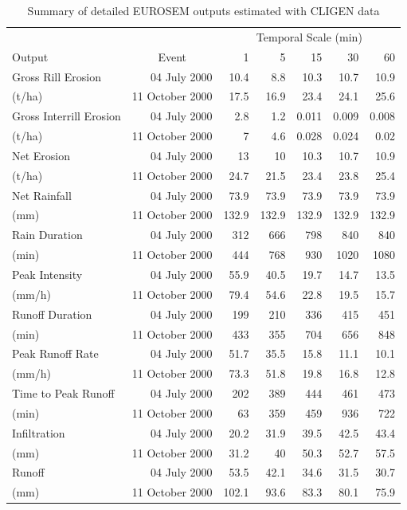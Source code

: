 \begin{table}[htbp]
\footnotesize
\caption{Summary of detailed EUROSEM outputs estimated with CLIGEN data}
\begin{center}
\begin{tabular}{lrrrrrr}
\toprule
\multicolumn{1}{l}{} & \multicolumn{1}{l}{} & \multicolumn{5}{c}{Temporal Scale
(min)} \\ \cmidrule{3-7}
\multicolumn{1}{l}{Output} & \multicolumn{1}{c}{Event} & 1 & 5 & 15 & 30 & 60 \\
\midrule
Gross Rill Erosion & 04 July 2000 & 10.4 & 8.8 & 10.3 & 10.7 & 10.9 \\
(t/ha) & 11 October 2000 & 17.5 & 16.9 & 23.4 & 24.1 & 25.6 \\ \midrule
Gross Interrill Erosion & 04 July 2000 & 2.8 & 1.2 & 0.011 & 0.009 & 0.008 \\
(t/ha) & 11 October 2000 & 7 & 4.6 & 0.028 & 0.024 & 0.02 \\ \midrule
Net Erosion & 04 July 2000 & 13 & 10 & 10.3 & 10.7 & 10.9 \\
(t/ha) & 11 October 2000 & 24.7 & 21.5 & 23.4 & 23.8 & 25.4 \\ \midrule
Net Rainfall & 04 July 2000 & 73.9 & 73.9 & 73.9 & 73.9 & 73.9 \\
(mm) & 11 October 2000 & 132.9 & 132.9 & 132.9 & 132.9 & 132.9 \\ \midrule
Rain Duration & 04 July 2000 & 312 & 666 & 798 & 840 & 840 \\
(min) & 11 October 2000 & 444 & 768 & 930 & 1020 & 1080 \\ \midrule
Peak Intensity & 04 July 2000 & 55.9 & 40.5 & 19.7 & 14.7 & 13.5 \\
(mm/h) & 11 October 2000 & 79.4 & 54.6 & 22.8 & 19.5 & 15.7 \\ \midrule
Runoff Duration & 04 July 2000 & 199 & 210 & 336 & 415 & 451 \\
(min) & 11 October 2000 & 433 & 355 & 704 & 656 & 848 \\ \midrule
Peak Runoff Rate & 04 July 2000 & 51.7 & 35.5 & 15.8 & 11.1 & 10.1 \\
(mm/h) & 11 October 2000 & 73.3 & 51.8 & 19.8 & 16.8 & 12.8 \\ \midrule
Time to Peak Runoff & 04 July 2000 & 202 & 389 & 444 & 461 & 473 \\
(min) & 11 October 2000 & 63 & 359 & 459 & 936 & 722 \\ \midrule
Infiltration & 04 July 2000 & 20.2 & 31.9 & 39.5 & 42.5 & 43.4 \\
(mm) & 11 October 2000 & 31.2 & 40 & 50.3 & 52.7 & 57.5 \\ \midrule
Runoff & 04 July 2000 & 53.5 & 42.1 & 34.6 & 31.5 & 30.7 \\
(mm) & 11 October 2000 & 102.1 & 93.6 & 83.3 & 80.1 & 75.9 \\ \bottomrule
\end{tabular}
\end{center}
\label{tab:eurosemscaleresultdetails}
\end{table}

